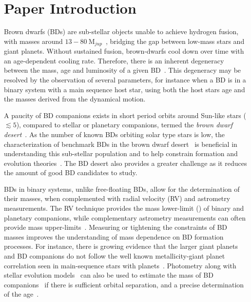 














\section{Paper Introduction}\label{sec:intro}
Brown dwarfs (BDs) are sub-stellar objects unable to achieve hydrogen fusion, with masses around \(13-80~\textrm{M}_{jup} \)~\citep{chabrier_theory_2000}, bridging the gap between low-mass stars and giant planets.
Without sustained fusion, brown-dwarfs cool down over time with an age-dependent cooling rate.
Therefore, there is an inherent degeneracy between the mass, age and luminosity of a given BD~\citep{burrows_nongray_1997}.
This degeneracy may be resolved by the observation of several parameters, for instance when a BD is in a binary system with a main sequence host star, using both the host stars age and the masses derived from the dynamical motion.

A paucity of BD companions exists in short period orbits around Sun-like stars (\(\lesssim5 \)\AU), compared to stellar or planetary companions, termed the \emph{brown dwarf desert}~\citep{halbwachs_exploring_2000, zucker_analysis_2001, sahlmann_search_2011}.
As the number of known BDs orbiting solar type stars is low, the characterization of benchmark BDs in the brown dwarf desert~\citep[e.g.][]{crepp_trends_2016} is beneficial in understanding this sub-stellar population and to help constrain formation and evolution theories~\citep{whitworth_formation_2007}.
The BD desert also provides a greater challenge as it reduces the amount of good BD candidates to study.

BDs in binary systems, unlike free-floating BDs, allow for the determination of their masses, when complemented with radial velocity ({RV}) and astrometry measurements.
The {RV} technique provides the mass lower-limit (\mtwosini{}) of binary and planetary companions, while complementary astrometry measurements can often provide mass upper-limits~\citep[e.g.][]{sahlmann_search_2011}.
Measuring or tightening the constraints of BD masses improves the understanding of mass dependence on BD formation processes.
For instance, there is growing evidence that the larger giant planets and BD companions do not follow the well known metallicity-giant planet correlation seen in main-sequence stars with planets~\citep[e.g.][]{santos_spectroscopic_2004,santos_observational_2017, maldonado_searching_2017}.
Photometry along with stellar evolution models~\citep[e.g.][]{baraffe_evolutionary_2003,allard_btsettl_2013} can also be used to estimate the mass of BD companions~\citep[e.g.][]{moutou_eccentricity_2017} if there is sufficient orbital separation, and a precise determination of the age~\citep{soderblom_ages_2010}.

